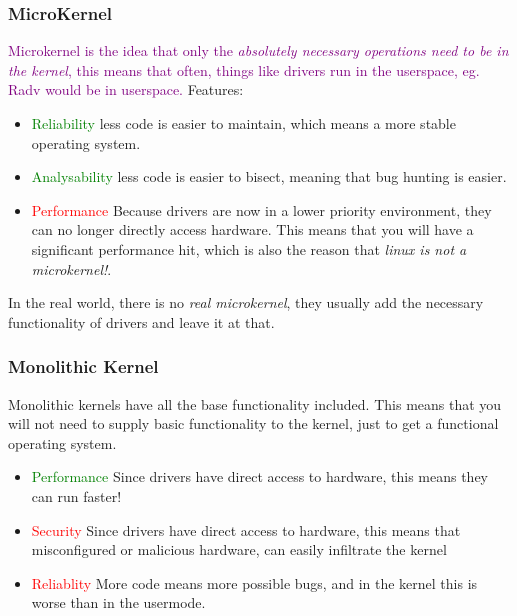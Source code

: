 \documentclass[main.tex,fontsize=8pt,paper=a4,paper=portrait,DIV=calc,]{scrartcl}
\begin{document}
\subsubsection{MicroKernel}
\textcolor{purple}{Microkernel is the idea that only the \emph{absolutely necessary operations need to be in the kernel}, this means that often, \newline
things like drivers run in the userspace, eg. Radv would be in userspace.}\newline
Features: 
\begin{itemize}
\item \textcolor{green}{Reliability}\newline
  less code is easier to maintain, which means a more stable operating system.
\item \textcolor{green}{Analysability}\newline
  less code is easier to bisect, meaning that bug hunting is easier.
\item \textcolor{red}{Performance}\newline
  Because drivers are now in a lower priority environment, they can no longer directly access hardware.\newline
  This means that you will have a significant performance hit, which is also the reason that \emph{linux is not a microkernel!}.
\end{itemize} 
In the real world, there is no \emph{real microkernel}, they usually add the necessary functionality of drivers and leave it at that. 

\subsubsection{Monolithic Kernel}
Monolithic kernels have all the base functionality included. This means that you will not need to supply basic functionality to the kernel,\newline
just to get a functional operating system.
\begin{itemize}
\item \textcolor{green}{Performance}\newline
  Since drivers have direct access to hardware, this means they can run faster!
\item \textcolor{red}{Security}\newline
  Since drivers have direct access to hardware, this means that misconfigured or malicious hardware, \newline
  can easily infiltrate the kernel
\item \textcolor{red}{Reliablity} \newline
  More code means more possible bugs, and in the kernel this is worse than in the usermode.
\end{itemize} 
\end{document}
